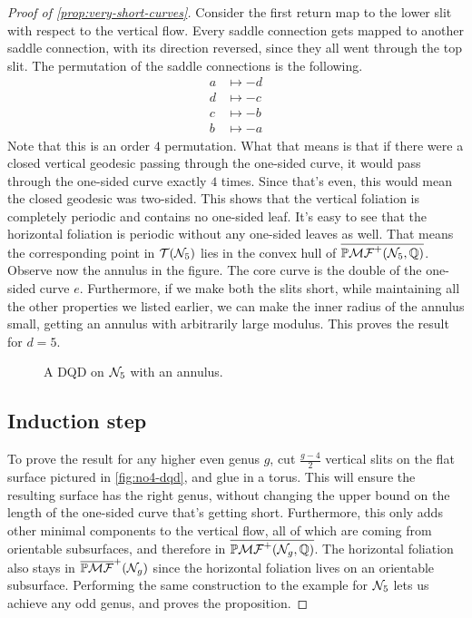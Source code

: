\documentclass[12pt, reqno]{amsart}
\begin{document}
\begin{proof}[Proof of \autoref{prop:very-short-curves}]
Consider the first return map to the lower slit with respect to the vertical flow.
Every saddle connection gets mapped to another saddle connection, with its direction reversed, since they all went through the top slit.
The permutation of the saddle connections is the following.
\begin{align*}
  a &\mapsto -d \\
  d &\mapsto -c \\
  c &\mapsto -b \\
  b &\mapsto -a
\end{align*}
Note that this is an order $4$ permutation.
What that means is that if there were a closed vertical geodesic passing through the one-sided curve, it would pass through the one-sided curve exactly $4$ times.
Since that's even, this would mean the closed geodesic was two-sided.
This shows that the vertical foliation is completely periodic and contains no one-sided leaf. It's easy to see that the horizontal foliation is periodic without any one-sided leaves as well.
That means the corresponding point in $\mathcal{T}(\mathcal{N}_5)$ lies in the convex hull of
$\overline{\mathbb{P}\mathcal{MF}^+(\mathcal{N}_5, \mathbb{Q})}$.
Observe now the annulus in the figure.
The core curve is the double of the one-sided curve $e$.
Furthermore, if we make both the slits short, while maintaining all the other properties we listed earlier, we can make the inner radius of the annulus small, getting an annulus with arbitrarily large modulus.
This proves the result for $d=5$.
\begin{figure}[h]
  \centering
  \caption{A DQD on $\mathcal{N}_5$ with an annulus.}
  \label{fig:no5-dqd}
\end{figure}

\subsection*{Induction step}
To prove the result for any higher even genus $g$, cut $\frac{g-4}{2}$ vertical slits on the flat surface pictured in \autoref{fig:no4-dqd}, and glue in a torus.
This will ensure the resulting surface has the right genus, without changing the upper bound on the length of the one-sided curve that's getting short.
Furthermore, this only adds other minimal components to the vertical flow, all of which are coming from orientable subsurfaces, and therefore in $\overline{\mathbb{P}\mathcal{MF}^+(\mathcal{N}_g, \mathbb{Q})}$.
The horizontal foliation also stays in $\overline{\mathbb{P}\mathcal{MF}}^+(\mathcal{N}_g)$ since the horizontal foliation lives on an orientable subsurface.
Performing the same construction to the example for $\mathcal{N}_5$ lets us achieve any odd genus, and proves the proposition.
\end{proof}
\end{document}
